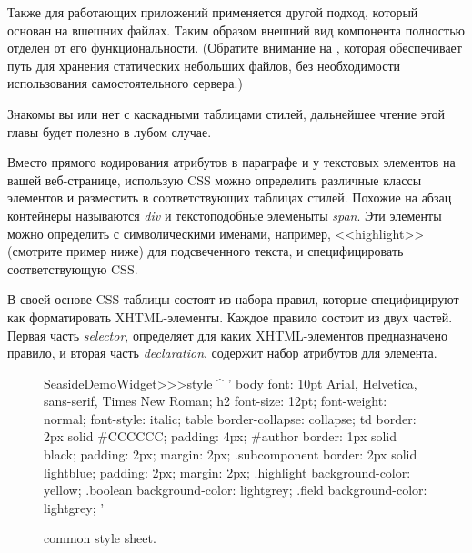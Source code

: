\documentclass[a4paper,10pt,twoside]{book}
\begin{document}
Также для работающих приложений применяется другой подход,
который основан на вшешних файлах.
Таким образом внешний вид компонента полностью отделен
от его функциональности.
(Обратите внимание на , которая обеспечивает путь
для хранения статических небольших файлов,
без необходимости использования самостоятельного сервера.)


Знакомы вы или нет с каскадными таблицами стилей,
дальнейшее чтение этой главы будет полезно в лубом случае.


Вместо прямого кодирования атрибутов в параграфе и у текстовых элементов
на вашей веб-странице,
использую CSS можно определить различные классы элементов
и разместить в соответствующих таблицах стилей.
Похожие на абзац контейнеры называются \emph{div}
и текстоподобные элеменыты \emph{span}.
Эти элементы можно определить с символическими именами,
например, <<highlight>> (смотрите пример ниже) для подсвеченного текста,
и специфицировать соответствующую CSS.


В своей основе CSS таблицы состоят из набора правил,
которые специфицируют как форматировать XHTML-элементы.
Каждое правило состоит из двух частей.
Первая часть \emph{selector}, определяет для каких XHTML-элементов
предназначено правило,
и вторая часть \emph{declaration}, содержит набор атрибутов для элемента.

\begin{figure}[tb]
\begin{code}{}
SeasideDemoWidget>>>style
	^ '
body {
	font: 10pt Arial, Helvetica, sans-serif, Times New Roman;
}
h2 {
	font-size: 12pt;
	font-weight: normal;
	font-style: italic;
}
table { border-collapse: collapse; }
td {
	border: 2px solid #CCCCCC;
	padding: 4px;
}
#author {
	border: 1px solid black;
	padding: 2px;
	margin: 2px;
}
.subcomponent {
	border: 2px solid lightblue;
	padding: 2px;
	margin: 2px;
}
.highlight { background-color: yellow; }
.boolean { background-color: lightgrey; }
.field { background-color: lightgrey; }
'
\end{code}
\caption{ common style sheet.
}
\end{figure}
\end{document}
